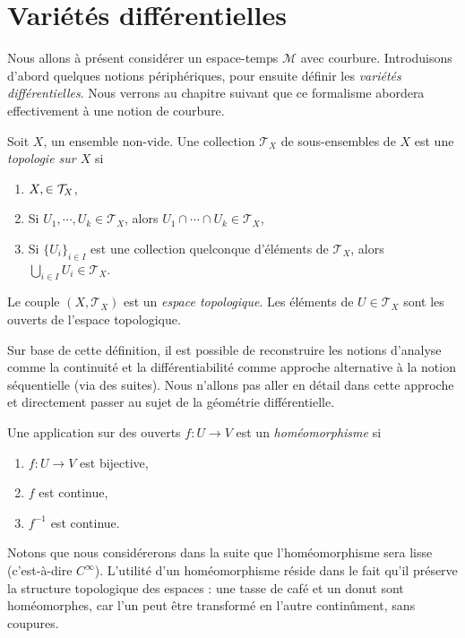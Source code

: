 \section{Variétés différentielles}
Nous allons à présent considérer un espace-temps $\mathcal{M}$ avec courbure. Introduisons d'abord quelques notions périphériques, pour ensuite définir les \emph{variétés différentielles}. Nous verrons au chapitre suivant que ce formalisme abordera effectivement à une notion de courbure.
\begin{theoremframe}
    \begin{defi}
        Soit $X$, un ensemble non-vide. Une collection $\mathcal{T}_X$ de sous-ensembles de $X$ est une \textit{topologie sur $X$} si
        \begin{enumerate}[label = \roman*.]
            \item $X,\empty \in \mathcal{T}_X$,
            \item Si $U_1,\cdots,U_k \in \mathcal{T}_X$, alors $U_1 \cap \cdots \cap U_k \in \mathcal{T}_X$,
            \item Si $\{ U_i\}_{i\in I}$ est une collection quelconque d'éléments de $\mathcal{T}_X$, alors $\bigcup_{i\in I} U_i \in \mathcal{T}_X$.
        \end{enumerate}
        Le couple $(X,\mathcal{T}_X)$ est un \textit{espace topologique}. Les éléments de $U\in \mathcal{T}_X$ sont les ouverts de l'espace topologique.
    \end{defi}
\end{theoremframe}
Sur base de cette définition, il est possible de reconstruire les notions d'analyse comme la continuité et la différentiabilité comme approche alternative à la notion séquentielle (via des suites). Nous n'allons pas aller en détail dans cette approche et directement passer au sujet de la géométrie différentielle.
\begin{theoremframe}
    \begin{defi}
        Une application sur des ouverts $f:U\to V$ est un \emph{homéomorphisme} si
        \begin{enumerate}[label = \roman*.]
            \item $f:U\to V$ est bijective,
            \item $f$ est continue,
            \item $f^{-1}$ est continue.
        \end{enumerate} 
    \end{defi}
\end{theoremframe}
Notons que nous considérerons dans la suite que l'homéomorphisme sera lisse (c'est-à-dire $C^\infty$). L'utilité d'un homéomorphisme réside dans le fait qu'il préserve la structure topologique des espaces : une tasse de café et un donut sont homéomorphes, car l'un peut être transformé en l'autre continûment, sans coupures. 
